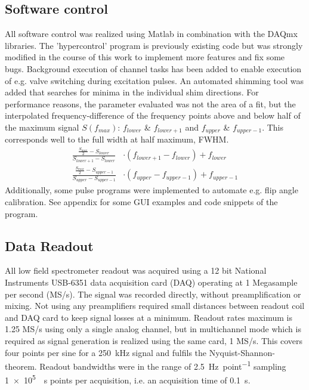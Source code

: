         \subsection{Software control}
        \label{sec:matMeth:hypercontrol}
        All software control was realized using Matlab in combination with the DAQmx libraries. The 'hypercontrol' program is previously existing code but was strongly modified in the course of this work to implement more features and fix some bugs. Background execution of channel tasks has been added to enable execution of e.g. valve switching during excitation pulses. An automated shimming tool was added that searches for minima in the individual shim directions. For performance reasons, the parameter evaluated was not the area of a fit, but the interpolated frequency-difference of the frequency points above and below half of the maximum signal $S(f_{max})$: $f_{lower}$ \& $f_{lower+1}$ and $f_{upper}$ \& $f_{upper-1}$. This corresponds well to the full width at half maximum, FWHM.
        \begin{equation}
            \begin{aligned}
                \frac{\frac{S_{max}}{2} - S_{lower}}{S_{lower+1} -S_{lower}}&\cdot (f_{lower + 1} -f_{lower}) + f_{lower}\\
                \frac{\frac{S_{max}}{2} - S_{upper -1}}{S_{upper} -S_{upper-1}}& \cdot (f_{upper} -f_{upper-1}) + f_{upper -1}
            \end{aligned}
        \end{equation}
            Additionally, some pulse programs were implemented to automate e.g. flip angle calibration. See appendix for some GUI examples and code snippets of the program.
        \subsection{Data Readout}
        All low field spectrometer readout was acquired using a 12 bit National Instruments USB-6351 data acquisition card (DAQ) operating at 1 Megasample per second (MS/s). The signal was recorded directly, without preamplification or mixing. Not using any preamplifiers required small distances between readout coil and DAQ card to keep signal losses at a minimum. Readout rates maximum is 1.25 MS/s using only a single analog channel, but in multichannel mode which is required as signal generation is realized using the same card, 1 MS/s. This covers four points per sine for a \SI{250}{\kilo\hertz} signal and fulfils the Nyquist-Shannon-theorem. Readout bandwidths were in the range of \SI{2.5}{\hertz\per point} sampling \SI{1e5}{\per\second} points per acquisition, i.e. an acquisition time of \SI{0.1}{\second}.
